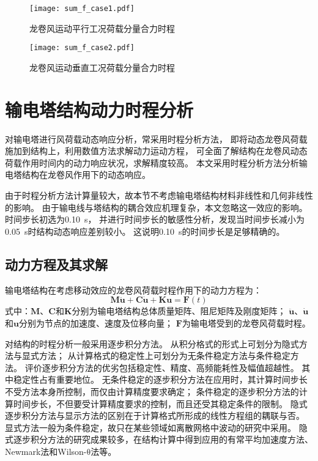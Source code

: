 \begin{figure}[!htpb]
    \centering
    \texttt{[image: sum\_f\_case1.pdf]}
    \caption{龙卷风运动平行工况荷载分量合力时程}
    \label{fig:sum_f_case1}
\end{figure}

\begin{figure}[!htpb]
    \centering
    \texttt{[image: sum\_f\_case2.pdf]}
    \caption{龙卷风运动垂直工况荷载分量合力时程}
    \label{fig:sum_f_case2}
\end{figure}

\section{输电塔结构动力时程分析}
对输电塔进行风荷载动态响应分析，常采用时程分析方法，
即将动态龙卷风荷载施加到结构上，利用数值方法求解动力运动方程，
可全面了解结构在龙卷风动态荷载作用时间内的动力响应状况，求解精度较高。
本文采用时程分析方法分析输电塔结构在龙卷风作用下的动态响应。

由于时程分析方法计算量较大，故本节不考虑输电塔结构材料非线性和几何非线性的影响。
由于输电线与塔结构的耦合效应机理复杂，本文忽略这一效应的影响。
时间步长初选为\SI{0.10}{s}，
并进行时间步长的敏感性分析，发现当时间步长减小为\SI{0.05}{s}时结构动态响应差别较小。
这说明\SI{0.10}{s}的时间步长是足够精确的。

\subsection{动力方程及其求解}
输电塔结构在考虑移动效应的龙卷风荷载时程作用下的动力方程为\cite{chopra2007dynamic}：
\begin{equation}\label{eqn:dynamic}
    \bm{M}\ddot{\bm{u}}+\bm{C}\dot{\bm{u}}+\bm{K}\bm{u} = \bm{F}(t)
\end{equation}
式中：$\bm{M}$、$\bm{C}$和$\bm{K}$分别为输电塔结构总体质量矩阵、阻尼矩阵及刚度矩阵；
$\ddot{\bm{u}}$、$\dot{\bm{u}}$和$\bm{u}$分别为节点的加速度、速度及位移向量；
$\bm{F}$为输电塔受到的龙卷风荷载时程。

对结构的时程分析一般采用逐步积分方法。
从积分格式的形式上可划分为隐式方法与显式方法；
从计算格式的稳定性上可划分为无条件稳定方法与条件稳定方法。
评价逐步积分方法的优劣包括稳定性、精度、高频能耗性及幅值超越性。
其中稳定性占有重要地位。
无条件稳定的逐步积分方法在应用时，其计算时间步长不受方法本身所控制，而仅由计算精度要求确定；
条件稳定的逐步积分方法的计算时间步长，不但要受计算精度要求的控制，而且还受其稳定条件的限制。
隐式逐步积分方法与显示方法的区别在于计算格式所形成的线性方程组的耦联与否。
显式方法一般为条件稳定，故只在某些领域如离散网格中波动的研究中采用。
隐式逐步积分方法的研究成果较多，在结构计算中得到应用的有常平均加速度方法、Newmark法和Wilson-$\mathrm{\theta}$法等。

